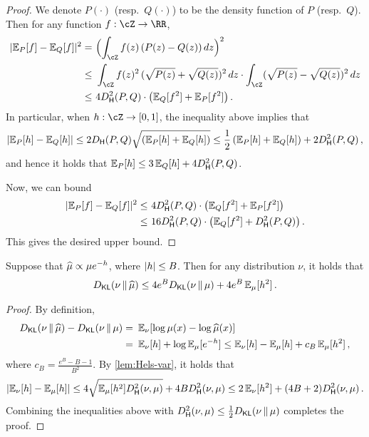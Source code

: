 \begin{proof}
We denote $P(\cdot)$ (resp.\ $Q(\cdot)$) to be the density function of $P$ (resp.\ $Q$). Then for any function $f:\cZ\to \RR$,
  \begin{align*}
    \abs{\En_P[f]-\En_Q[f]}^2=&~ \prn[\Big]{\int_{\cZ} f(z)\,(P(z)-Q(z))\, dz}^2 \\
    \leq&~\int_{\cZ} f(z)^2\,(\sqrt{P(z)}+\sqrt{Q(z)})^2 \, dz \cdot \int_{\cZ} (\sqrt{P(z)}-\sqrt{Q(z)})^2 \, dz \\
    \leq&~ 4\Dhels{P}{Q} \cdot \prn*{ \En_Q[f^2]+ \En_{P}[f^2]}\,.
  \end{align*}
  In particular, when $h:\cZ\to [0,1]$, the inequality above implies that 
  \begin{align*}
    \abs{\En_P[h]-\En_Q[h]}\leq 2\Dhel{P}{Q} \sqrt{ (\En_P[h]+\En_Q[h])}
    \leq \frac{1}{2}\,(\En_P[h]+\En_Q[h])+2\Dhels{P}{Q}\,,
  \end{align*}
  and hence it holds that $\En_P[h]\leq 3\En_Q[h]+4\Dhels{P}{Q}$. 

  Now, we can bound
  \begin{align*}
    \abs{\En_P[f]-\En_Q[f]}^2
    \leq&~ 4\Dhels{P}{Q} \cdot \prn*{ \En_Q[f^2]+ \En_{P}[f^2]} \\
    \leq&~ 16\Dhels{P}{Q} \cdot \prn*{ \En_Q[f^2]+ \Dhels{P}{Q}}\,.
  \end{align*}
   This gives the desired upper bound.
\end{proof}

\begin{lemma}\label{lem:KL-perturb}
Suppose that $\widehat{\mu}\propto \mu e^{-h}$, where $\lvert h\rvert\leq B$. Then for any distribution $\nu$, it holds that
\begin{align*}
    \Dkl{\nu}{\muhat}\leq 4e^B\Dkl{\nu}{\mu}+4e^B\En_\mu[h^2]\,.
\end{align*} 
\end{lemma}
\begin{proof}
By definition,
\begin{align*}
    \Dkl{\nu}{\muhat}-\Dkl{\nu}{\mu}=&~\En_{\nu}[\log \mu(x)-\log \muhat(x)] \\
    =&~ \En_\nu[h]+\log \En_{\mu}[e^{-h}]
    \leq \En_\nu[h]-\En_\mu[h]+c_B\En_\mu[h^2]\,,
\end{align*}
where $c_B=\frac{e^B-B-1}{B^2}$. By \cref{lem:Hels-var}, it holds that
\begin{align*}
    \abs{\En_\nu[h]-\En_\mu[h]}\leq 4\sqrt{\En_\mu[h^2]\Dhels{\nu}{\mu}} + 4B\Dhels{\nu}{\mu} 
    \le 2\En_\nu[h^2] + (4B+2)\Dhels{\nu}{\mu}\,.
\end{align*}
Combining the inequalities above with $\Dhels{\nu}{\mu}\leq \frac12 \Dkl{\nu}{\mu}$ completes the proof.
\end{proof}






